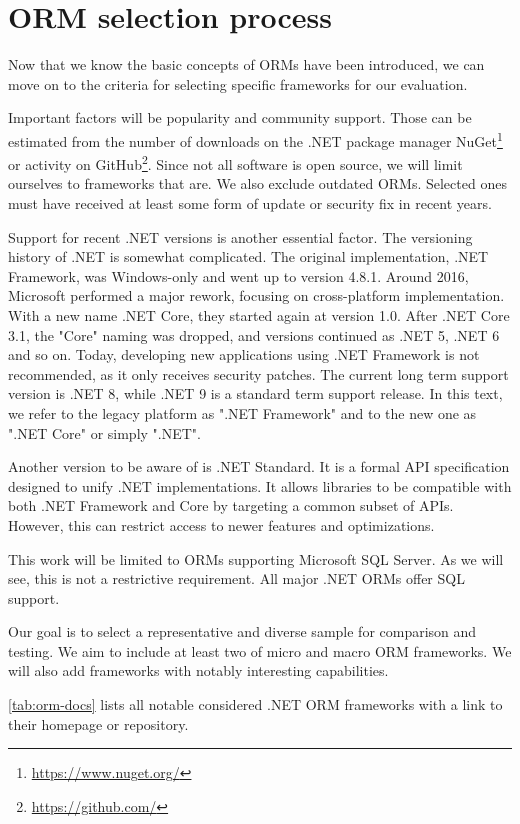 \section{ORM selection process}
Now that we know the basic concepts of ORMs have been introduced, we can move on to the criteria for selecting specific frameworks for our evaluation.

Important factors will be popularity and community support. Those can be estimated from the number of downloads on the .NET package manager NuGet\footnote{\url{https://www.nuget.org/}} or activity on GitHub\footnote{\url{https://github.com/}}. Since not all software is open source, we will limit ourselves to frameworks that are. We also  exclude outdated ORMs. Selected ones must have received at least some form of update or security fix in recent years.

Support for recent .NET versions is another essential factor. The versioning history of .NET is somewhat complicated. The original implementation, .NET Framework, was Windows-only and went up to version 4.8.1. Around 2016, Microsoft performed a major rework, focusing on cross-platform implementation. With a new name .NET Core, they started again at version 1.0. After .NET Core 3.1, the "Core" naming was dropped, and versions continued as .NET 5, .NET 6 and so on. Today, developing new applications using .NET Framework is not recommended, as it only receives security patches. The current long term support version is .NET 8, while .NET 9 is a standard term support release. In this text, we refer to the legacy platform as ".NET Framework" and to the new one as ".NET Core" or simply ".NET". \cite{NETFrameworkVersions}\cite{NETversions}

Another version to be aware of is .NET Standard. It is a formal API specification designed to unify .NET implementations. It allows libraries to be compatible with both .NET Framework and Core by targeting a common subset of APIs. However, this can restrict access to newer features and optimizations. \cite{NETStandard}

This work will be limited to ORMs supporting Microsoft SQL Server. As we will see, this is not a restrictive requirement. All major .NET ORMs offer SQL support.

Our goal is to select a representative and diverse sample for comparison and testing. We aim to include at least two of micro and macro ORM frameworks. We will also add frameworks with notably interesting capabilities.

\autoref{tab:orm-docs} lists all notable considered .NET ORM frameworks with a link to their homepage or repository.

